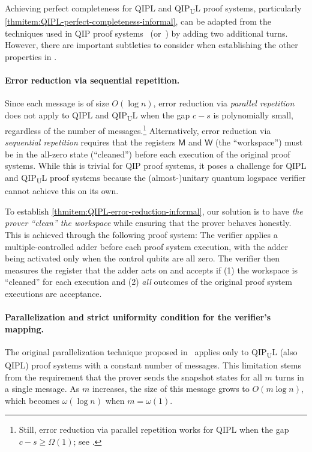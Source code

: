 \documentclass[10pt,a4paper]{article}
\numberwithin{equation}{section}
\numberwithin{figure}{section}
\newcommand{\QIP}{\textnormal{\textsf{QIP}}\xspace}
\newcommand{\QIPL}{\textnormal{\textsf{QIPL}}\xspace}
\newcommand{\QIPUL}{\texorpdfstring{\textnormal{\textsf{QIP}\textsubscript{\textnormal{U}}\textsf{L}}}\xspace}
\newcommand{\sfM}{\mathsf{M}}
\newcommand{\sfW}{\mathsf{W}}
\begin{document}
Achieving perfect completeness for \QIPL{} and \QIPUL{} proof systems, particularly \ref{thmitem:QIPL-perfect-completeness-informal}, can be adapted from the techniques used in \QIP{} proof systems~\cite[Section 4.2.1]{VW16} (or~\cite[Section 3]{KW00}) by adding two additional turns. However, there are important subtleties to consider when establishing the other properties in . 

\paragraph{Error reduction via sequential repetition.}
Since each message is of size $O(\log n)$, error reduction via \textit{parallel repetition} does not apply to \QIPL{} and \QIPUL{} when the gap $c-s$ is polynomially small, regardless of the number of messages.\footnote{Still, error reduction via parallel repetition works for \QIPL{} when the gap $c-s \geq \Omega(1)$; see .} Alternatively, error reduction via \textit{sequential repetition} requires that the registers $\sfM$ and $\sfW$ (the ``workspace'') must be in the all-zero state (``cleaned'') before each execution of the original proof systems. While this is trivial for \QIP{} proof systems, it poses a challenge for \QIPL{} and \QIPUL{} proof systems because the (almost-)unitary quantum logspace verifier cannot achieve this on its own. 

To establish \ref{thmitem:QIPL-error-reduction-informal}, our solution is to have \textit{the prover ``clean'' the workspace} while ensuring that the prover behaves honestly. This is achieved through the following proof system: The verifier applies a multiple-controlled adder before each proof system execution, with the adder being activated only when the control qubits are all zero. The verifier then measures the register that the adder acts on and accepts if (1) the workspace is ``cleaned'' for each execution and (2) \textit{all} outcomes of the original proof system executions are acceptance. 

\paragraph{Parallelization and strict uniformity condition for the verifier's mapping.}
The original parallelization technique proposed in~\cite[Section 4]{KW00} applies only to \QIPUL{} (also \QIPL{}) proof systems with a constant number of messages. This limitation stems from the requirement that the prover sends the snapshot states for all $m$ turns in a single message. As $m$ increases, the size of this message grows to $O(m \log n)$, which becomes $\omega(\log n)$ when $m = \omega(1)$. 
\end{document}
